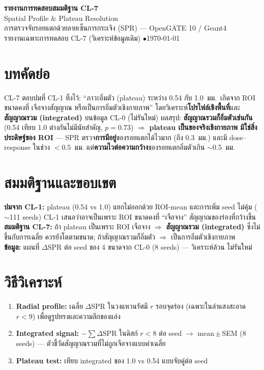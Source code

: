 \documentclass[14pt]{extarticle}
\begin{document}
\begin{center}
{\LARGE\bfseries\color{theme} รายงานการทดสอบสมมติฐาน CL-7}\\[3pt]
{\Large Spatial Profile \& Plateau Resolution}\\[5pt]
{\small การตรวจจับรอยแตกด้วยลายเซ็นการกระเจิง (SPR) --- OpenGATE 10 / Geant4}\\
{\small รายงานเฉพาะการทดสอบ CL-7 (วิเคราะห์ข้อมูลเดิม) \quad$\bullet$\quad \today}
\end{center}
\vspace{2pt}{\color{theme!45}\hrule}\vspace{8pt}

\section*{บทคัดย่อ}
CL-7 ตอบปมที่ CL-1 ทิ้งไว้: ``ภาวะอิ่มตัว (plateau) ระหว่าง 0.54 กับ 1.0~มม.\ เกิดจาก ROI ขนาดคงที่
เจือจางสัญญาณ หรือเป็นการอิ่มตัวเชิงกายภาพ'' โดยวิเคราะห์\textbf{โปรไฟล์เชิงพื้นที่}และ\textbf{สัญญาณรวม
(integrated)} บนข้อมูล CL-0 (ไม่รันใหม่) ผลสรุป: \textbf{สัญญาณรวมก็อิ่มตัวเช่นกัน} (0.54 เทียบ 1.0
ต่างกันไม่มีนัยสำคัญ, $p=0.73$) $\Rightarrow$ \textbf{plateau เป็นของจริงเชิงกายภาพ มิใช่สิ่งประดิษฐ์ของ ROI}
--- SPR ตรวจ\textbf{การมีอยู่}ของรอยแตกได้ไวมาก (ถึง 0.3~มม.) และมี dose--response ในช่วง $<0.5$~มม.
แต่\textbf{ความไวต่อความกว้าง}ของรอยแตกอิ่มตัวเกิน $\sim$0.5~มม.

\section{สมมติฐานและขอบเขต}
\textbf{ปมจาก CL-1:} plateau (0.54 vs 1.0) แยกไม่ออกด้วย ROI-mean และการเพิ่ม seed ไม่คุ้ม ($\sim$111 seeds)
CL-1 เสนอว่าอาจเป็นเพราะ ROI ขนาดคงที่ ``เจือจาง'' สัญญาณของร่องที่กว้างขึ้น\\
\textbf{สมมติฐาน CL-7:} ถ้า plateau เป็นเพราะ ROI เจือจาง $\Rightarrow$ \textbf{สัญญาณรวม (integrated)}
ซึ่งไม่ขึ้นกับการเฉลี่ย ควรยังโตตามขนาด; ถ้าสัญญาณรวมก็อิ่มตัว $\Rightarrow$ เป็นการอิ่มตัวเชิงกายภาพ\\
\textbf{ข้อมูล:} แผนที่ $\Delta$SPR ต่อ seed ของ 4 ขนาดจาก CL-0 (8 seeds) --- วิเคราะห์ล้วน ไม่รันใหม่

\section{วิธีวิเคราะห์}
\begin{enumerate}
  \item \textbf{Radial profile:} เฉลี่ย $\Delta$SPR ในวงแหวนรัศมี $r$ รอบจุดร่อง (เฉพาะในลำแสงสะอาด $r<9$)
        เพื่อดูรูปทรงและความลึกของแอ่ง
  \item \textbf{Integrated signal:} $-\sum\Delta\mathrm{SPR}$ ในดิสก์ $r<8$ ต่อ seed $\to$ mean\,$\pm$\,SEM
        (8 seeds) --- ตัวชี้วัดสัญญาณรวมที่ไม่ถูกเจือจางแบบค่าเฉลี่ย
  \item \textbf{Plateau test:} เทียบ integrated ของ 1.0 vs 0.54 แบบจับคู่ต่อ seed
\end{enumerate}
\end{document}

